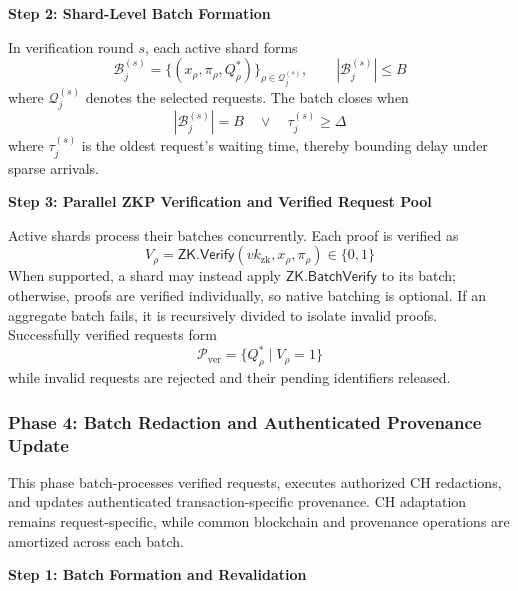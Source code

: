 \documentclass[lettersize,journal]{IEEEtran}
\begin{document}
\noindent\textbf{Step 2: Shard-Level Batch Formation}

In verification round $s$, each active shard forms
\begin{equation}
\mathcal{B}_j^{(s)}
=
\{(x_\rho,\pi_\rho,Q_\rho^{*})\}_{\rho\in\mathcal{Q}_j^{(s)}},
\qquad
|\mathcal{B}_j^{(s)}|\leq B
\label{eq:proof-batch}
\end{equation}
where $\mathcal{Q}_j^{(s)}$ denotes the selected requests. The batch closes when
\begin{equation}
|\mathcal{B}_j^{(s)}|=B
\quad\lor\quad
\tau_j^{(s)}\geq\Delta
\label{eq:batch-close}
\end{equation}
where $\tau_j^{(s)}$ is the oldest request's waiting time, thereby bounding delay under sparse arrivals.

\noindent\textbf{Step 3: Parallel ZKP Verification and Verified Request Pool}

Active shards process their batches concurrently. Each proof is verified as
\begin{equation}
V_\rho=
\mathsf{ZK.Verify}(vk_{\mathrm{zk}},x_\rho,\pi_\rho)\in\{0,1\}
\label{eq:individual-zk-verification}
\end{equation}
When supported, a shard may instead apply
$\mathsf{ZK.BatchVerify}$ to its batch; otherwise, proofs are verified
individually, so native batching is optional. If an aggregate batch fails,
it is recursively divided to isolate invalid proofs. Successfully verified
requests form
\begin{equation}
\mathcal{P}_{\mathrm{ver}}
=
\{Q_\rho^{*}\mid V_\rho=1\}
\label{eq:verified-pool}
\end{equation}
while invalid requests are rejected and their pending identifiers released.
\smallskip

\subsubsection*{\textbf{Phase 4: Batch Redaction and Authenticated Provenance Update}}

This phase batch-processes verified requests, executes authorized CH
redactions, and updates authenticated transaction-specific provenance.
CH adaptation remains request-specific, while common blockchain and
provenance operations are amortized across each batch.

\noindent\textbf{Step 1: Batch Formation and Revalidation}
\end{document}
